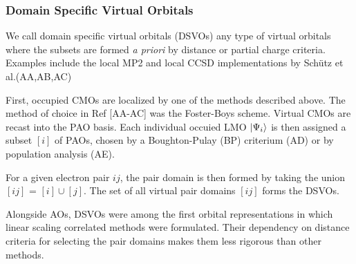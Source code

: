 
\subsubsection*{Domain Specific Virtual Orbitals}

We call domain specific virtual orbitals (DSVOs) any type of virtual orbitals where the subsets are formed \emph{a priori} by distance or partial charge criteria. Examples include the local MP2 and local CCSD implementations by Schütz et al.(AA,AB,AC)

First, occupied CMOs are localized by one of the methods described above. The method of choice in Ref [AA-AC] was the Foster-Boys scheme. Virtual CMOs are recast into the PAO basis. Each individual occuied LMO $\ket{\Psi_i}$ is then assigned a subset $[i]$ of PAOs, chosen by a Boughton-Pulay (BP) criterium (AD) or by population analysis (AE). 

For a given electron pair $ij$, the pair domain is then formed by taking the union $[ij]$ = $[i] \cup [j]$. The set of all virtual pair domains $[ij]$ forms the DSVOs.

Alongside AOs, DSVOs were among the first orbital representations in which linear scaling correlated methods were formulated. Their dependency on distance criteria for selecting the pair domains makes them less rigorous than other methods. 


